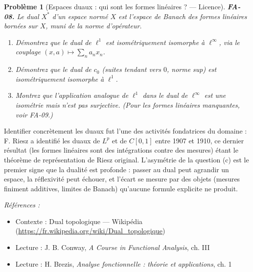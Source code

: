 \documentclass[11pt]{article}
\newtheorem{problem}{Problème}
\newenvironment{refs}{\par\small\noindent\emph{Références :}\begin{itemize}\setlength\itemsep{0pt}}{\end{itemize}\normalsize}
\begin{document}
\bigskip

\begin{problem}[{Espaces duaux : qui sont les formes linéaires ? --- Licence}]
\textbf{FA-08.} Le dual $ X^{*} $ d'un espace normé $ X $ est l'espace de Banach des formes
linéaires bornées sur $ X $, muni de la norme d'opérateur.
\begin{enumerate}
\item[(a)] Démontrez que le dual de $ \ell^1 $ est isométriquement isomorphe à $ \ell^\infty $, via le
couplage $ (x, a) \mapsto \sum_n a_n x_n $.
\item[(b)] Démontrez que le dual de $ c_0 $ (suites tendant vers $ 0 $, norme sup) est isométriquement
isomorphe à $ \ell^1 $.
\item[(c)] Montrez que l'application analogue de $ \ell^1 $ dans le dual de $ \ell^\infty $ est une
isométrie mais n'est \textit{pas} surjective. (Pour les formes linéaires manquantes, voir FA-09.)
\end{enumerate}

\end{problem}

\noindent Identifier concrètement les duaux fut l'une des activités fondatrices du domaine :
F. Riesz a identifié les duaux de $ L^p $ et de $ C[0,1] $ entre 1907 et 1910, ce dernier résultat
(les formes linéaires sont des intégrations contre des mesures) étant le \og{} théorème de représentation
de Riesz \fg{} original. L'asymétrie de la question (c) est le premier signe que la dualité est profonde :
passer au dual peut agrandir un espace, la réflexivité peut échouer, et l'écart se mesure par des
objets (mesures finiment additives, limites de Banach) qu'aucune formule explicite ne produit.

\begin{refs}
\item Contexte : Dual topologique --- Wikipédia (\url{https://fr.wikipedia.org/wiki/Dual_topologique})
\item Lecture : J. B. Conway, \textit{A Course in Functional Analysis}, ch. III
\item Lecture : H. Brezis, \textit{Analyse fonctionnelle : théorie et applications}, ch. 1
\end{refs}

\bigskip
\end{document}
